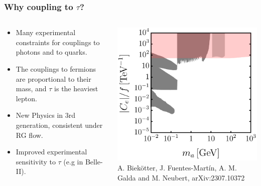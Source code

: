 \documentclass[mathserif, 10pt, aspectratio=169]{beamer}
\begin{document}
\begin{frame}\frametitle{Why coupling to $\tau$?}
    \begin{columns}
        \begin{column}{0.6\textwidth}
            \begin{itemize}\setlength{\itemsep}{10pt}
                \item Many experimental constraints for couplings to photons and to quarks.
                \item The couplings to fermions are proportional to their mass, and $\tau$ is the heaviest lepton.
                \item New Physics in 3rd generation, consistent under RG flow.
                \item Improved experimental sensitivity to $\tau$ (e.g in Belle-II).
            \end{itemize}
        \end{column}
        \begin{column}{0.27\textwidth}
            \includegraphics[width=\columnwidth]{figures/Neubert_Ce_Bounds.pdf}\\{\scriptsize A. Biekötter, J. Fuentes-Martín, A. M. Galda and M. Neubert, arXiv:2307.10372}
        \end{column}
    \end{columns}
\end{frame}
\end{document}
